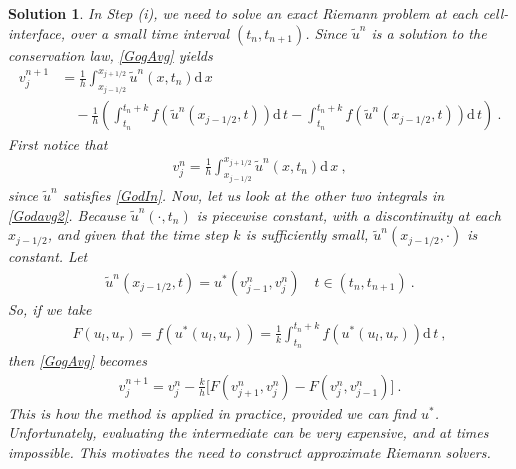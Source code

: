 \documentclass[10pt,letterpaper]{article}
\newcommand{\dif}[1][]{\mathrm{d} {#1}\,}
\newcommand{\rb}[1]{ \left(  {#1} \right) }
\newcommand{\frb}[1]{ \left(  {#1} \right) }
\theoremstyle{break}
\newtheorem{mysolution}{Solution}
\newenvironment{solution}{\begin{mysolution}}{\end{mysolution}}
\begin{document}
\begin{solution}
    In Step (i), we need to solve an exact Riemann problem at each cell-interface, over a small time interval $(t_n,t_{n+1})$. Since $\widetilde u^n$ is a solution to the conservation law, \eqref{GogAvg} yields
    \begin{align} \label{Godavg2}
        v_{j}^{n+1} &=\frac{1}{h}\int_{x_{j-1/2}}^{x_{j+1/2}}\tilde{u}^{n}\frb{x,t_{n}}\dif x\\
            &\quad -\frac{1}{h}\rb{
                \int_{t_n}^{t_n+k} f\frb{\tilde{u}^{n}\frb{x_{j-1/2},t}}\dif t
                -\int_{t_n}^{t_n+k} f\frb{\tilde{u}^{n}\frb{x_{j-1/2},t}}\dif t}\ .
    \end{align}
    First notice that
    \begin{gather}
        v^n_j=\frac{1}{h}\int_{x_{j-1/2}}^{x_{j+1/2}}\tilde{u}^{n}\frb{x,t_{n}}\dif x\ ,
    \end{gather}
    since $\widetilde u^n$ satisfies \eqref{GodIn}.
    Now, let us look at the other two integrals in \eqref{Godavg2}.
    Because $\widetilde u^n\frb{\cdot,t_n}$ is piecewise constant, with a discontinuity at each $x_{j-1/2}$, 
    and given that the time step $k$ is sufficiently small, $\widetilde u^n\frb{x_{j-1/2},\cdot}$ is constant. Let
    \begin{gather}
        \tilde{u}^{n}\frb{x_{j-1/2},t}=u^*\frb{v^n_{j-1},v^n_{j}}
        \quad
        t\in(t_n,t_{n+1})\ .
    \end{gather}
    So, if we take
    \begin{gather}
        F(u_l,u_r)=f\frb{u^*(u_l,u_r)}=\frac{1}{k}\int_{t_n}^{t_n+k} f\frb{u^*(u_l,u_r)}\dif t\ ,
    \end{gather}
    then \eqref{GogAvg} becomes
    \begin{gather} \label{GodCons}
        v^{n+1}_j=v^n_j-\frac{k}{h}\Big[ F\frb{v^n_{j+1},v^n_{j}} -F\frb{v^n_{j},v^n_{j-1}}\Big]\ .
    \end{gather}
    This is how the method is applied in practice, provided we can find $u^*$. Unfortunately, evaluating the intermediate can be very expensive, and at times impossible. This motivates the need to construct \textit{approximate Riemann solvers}.
\end{solution}
\end{document}
